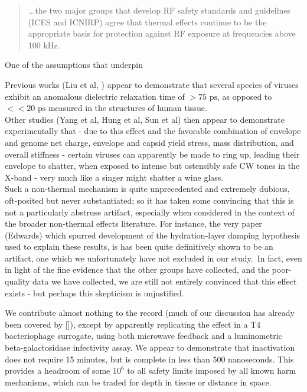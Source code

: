 \documentclass[paper.tex]{subfiles}
\begin{document}
\begin{quote}
	...the two major groups that develop RF safety standards and
	guidelines (ICES and ICNIRP) agree that thermal effects continue to be the appropriate basis for protection
	against RF exposure at frequencies above 100 kHz.
\end{quote}



One of the assumptions that underpin 



Previous works (Liu et al, ) appear to demonstrate that several species of viruses exhibit an anomalous dielectric relaxation time of $> 75 \text{ ps}$, as opposed to $<< 20 \text{ ps}$ \footnotemark measured in the structures of human tissue.\\

Other studies (Yang et al, Hung et al, Sun et al) then appear to demonstrate experimentally that - due to this effect and the favorable combination of envelope and genome net charge, envelope and capsid yield stress, mass distribution, and overall stiffness - certain viruses can  apparently be made to ring up, leading their envelope to shatter, when exposed to intense but ostensibly safe CW tones in the X-band - very much like a singer might shatter a wine glass.\\

Such a non-thermal mechanism is quite unprecedented and extremely dubious, oft-posited but never substantiated; so it has taken some convincing that this is not a particularly abstruse artifact, especially when considered in the context of the broader non-thermal effects literature. For instance, the very paper (Edwards) which spurred development of the hydration-layer damping hypothesis used to explain these results, is has been quite\cite{Resonances1987} definitively\cite{Microwave1993a} shown to be an artifact, one which we unfortunately have not excluded in our study.\footnotemark \ In fact, even in light of the fine evidence that the other groups have collected, and the poor-quality data we have collected, we are still not entirely convinced that this effect exists - but perhaps this skepticism is unjustified.\\


We contribute almost nothing to the record (much of our discussion has already been covered by []), except by apparently replicating the effect in a T4 bacteriophage surrogate, using both microwave feedback and a luminometric beta-galactosidase infectivity assay. We appear to demonstrate that inactivation does not require 15 minutes, but is complete in less than 500 nanoseconds. This provides a headroom of some $10^6$ to all safety limits imposed by all known harm mechanisms, which can be traded for depth in tissue or distance in space. \\
\end{document}
